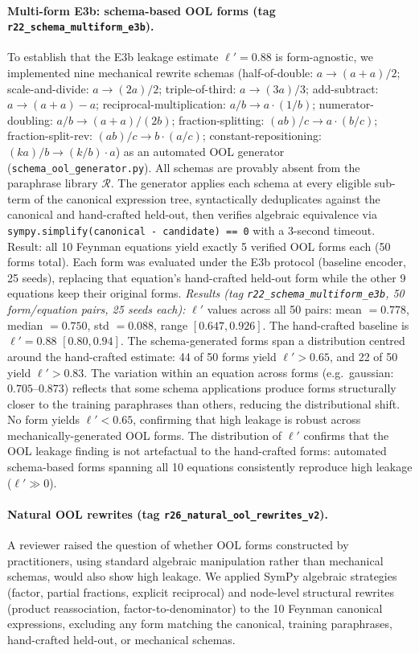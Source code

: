 \paragraph{Multi-form E3b: schema-based OOL forms (tag \texttt{r22\_schema\_multiform\_e3b}).}  To establish that the E3b leakage estimate $\ell'{=}0.88$ is form-agnostic, we implemented nine mechanical rewrite schemas (half-of-double: $a \to (a{+}a)/2$; scale-and-divide: $a \to (2a)/2$; triple-of-third: $a \to (3a)/3$; add-subtract: $a \to (a{+}a){-}a$; reciprocal-multiplication: $a/b \to a {\cdot} (1/b)$; numerator-doubling: $a/b \to (a{+}a)/(2b)$; fraction-splitting: $(ab)/c \to a{\cdot}(b/c)$; fraction-split-rev: $(ab)/c \to b{\cdot}(a/c)$; constant-repositioning: $(ka)/b \to (k/b){\cdot}a$) as an automated OOL generator (\texttt{schema\_ool\_generator.py}). All schemas are provably absent from the paraphrase library $\mathcal{R}$. The generator applies each schema at every eligible sub-term of the canonical expression tree, syntactically deduplicates against the canonical and hand-crafted held-out, then verifies algebraic equivalence via \texttt{sympy.simplify(canonical - candidate) == 0} with a 3-second timeout. Result: all 10 Feynman equations yield exactly 5 verified OOL forms each (50 forms total). Each form was evaluated under the E3b protocol (baseline encoder, 25 seeds), replacing that equation's hand-crafted held-out form while the other 9 equations keep their original forms. \emph{Results (tag \texttt{r22\_schema\_multiform\_e3b}, 50 form/equation pairs, 25 seeds each):} $\ell'$ values across all 50 pairs: mean $= 0.778$, median $= 0.750$, std $= 0.088$, range $[0.647, 0.926]$. The hand-crafted baseline is $\ell'{=}0.88$ $[0.80, 0.94]$. The schema-generated forms span a distribution centred around the hand-crafted estimate: 44 of 50 forms yield $\ell' > 0.65$, and 22 of 50 yield $\ell' > 0.83$. The variation within an equation across forms (e.g.\ gaussian: $0.705$--$0.873$) reflects that some schema applications produce forms structurally closer to the training paraphrases than others, reducing the distributional shift. No form yields $\ell' < 0.65$, confirming that high leakage is robust across mechanically-generated OOL forms. The distribution of $\ell'$ confirms that the OOL leakage finding is not artefactual to the hand-crafted forms: automated schema-based forms spanning all 10 equations consistently reproduce high leakage ($\ell' \gg 0$).

\paragraph{Natural OOL rewrites (tag \texttt{r26\_natural\_ool\_rewrites\_v2}).} A reviewer raised the question of whether OOL forms constructed by practitioners, using standard algebraic manipulation rather than mechanical schemas, would also show high leakage.  We applied SymPy algebraic strategies (factor, partial fractions, explicit reciprocal) and node-level structural rewrites (product reassociation, factor-to-denominator) to the 10 Feynman canonical expressions, excluding any form matching the canonical, training paraphrases, hand-crafted held-out, or mechanical schemas.

